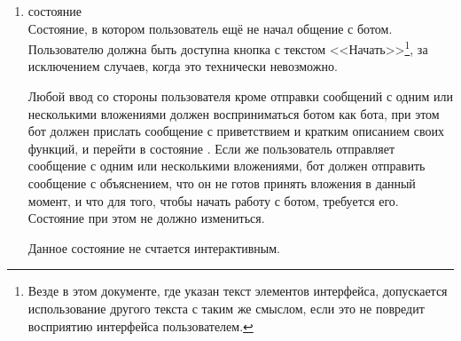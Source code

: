         \begin{enumerate}
            \item \label{itm:req:ui:states:init}
                 состояние \\
                Состояние, в котором пользователь ещё не начал общение с ботом.
                Пользователю должна быть доступна кнопка с текстом <<Начать>>\footnote{
                Везде в этом документе, где указан текст элементов интерфейса, допускается
                использование другого текста с таким же смыслом, если это не повредит восприятию
                интерфейса пользователем.}, за исключением случаев, когда это технически невозможно.

                Любой ввод со стороны пользователя кроме отправки сообщений с одним или несколькими
                вложениями должен восприниматься ботом как  бота, при этом бот должен прислать
                сообщение с приветствием и кратким описанием своих функций, и перейти в состояние
                \hyperref[itm:req:ui:states:mainmenu]{}.
                Если же пользователь отправляет сообщение с одним или несколькими
                вложениями, бот должен отправить сообщение с объяснением, что он не готов принять вложения
                в данный момент, и что для того, чтобы начать работу с ботом, требуется 
                его. Состояние при этом не должно измениться.

                Данное состояние не счтается интерактивным.


\end{enumerate}

